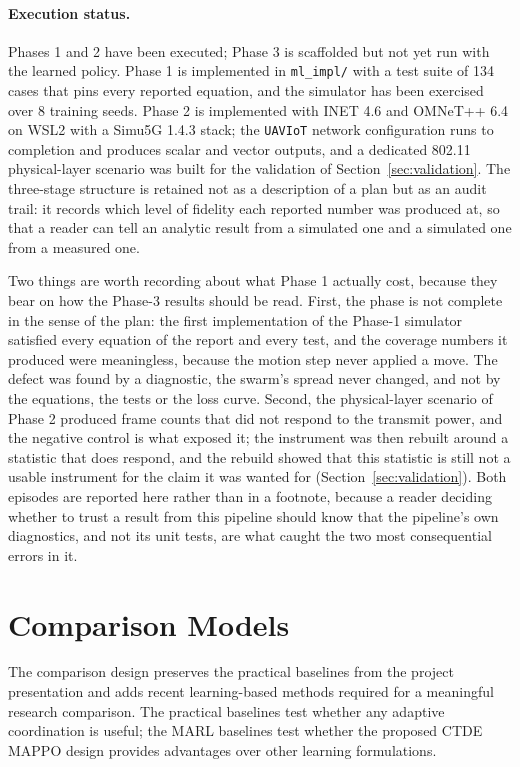 \documentclass[conference]{IEEEtran}
\newcommand{\tokMappoNSeeds}{8}
\newcommand{\tokNTests}{134}
\begin{document}
\paragraph{Execution status.}
Phases 1 and 2 have been executed; Phase 3 is scaffolded but not yet run with the learned policy. Phase 1 is implemented in \texttt{ml\_impl/} with a test suite of \tokNTests{} cases that pins every reported equation, and the simulator has been exercised over \tokMappoNSeeds{} training seeds. Phase 2 is implemented with INET 4.6 and OMNeT++ 6.4 on WSL2 with a Simu5G 1.4.3 stack; the \texttt{UAVIoT} network configuration runs to completion and produces scalar and vector outputs, and a dedicated 802.11 physical-layer scenario was built for the validation of Section~\ref{sec:validation}. The three-stage structure is retained not as a description of a plan but as an audit trail: it records which level of fidelity each reported number was produced at, so that a reader can tell an analytic result from a simulated one and a simulated one from a measured one.

Two things are worth recording about what Phase 1 actually cost, because they bear on how the Phase-3 results should be read. First, the phase is not complete in the sense of the plan: the first implementation of the Phase-1 simulator satisfied every equation of the report and every test, and the coverage numbers it produced were meaningless, because the motion step never applied a move. The defect was found by a diagnostic, the swarm's spread never changed, and not by the equations, the tests or the loss curve. Second, the physical-layer scenario of Phase 2 produced frame counts that did not respond to the transmit power, and the negative control is what exposed it; the instrument was then rebuilt around a statistic that does respond, and the rebuild showed that this statistic is still not a usable instrument for the claim it was wanted for (Section~\ref{sec:validation}). Both episodes are reported here rather than in a footnote, because a reader deciding whether to trust a result from this pipeline should know that the pipeline's own diagnostics, and not its unit tests, are what caught the two most consequential errors in it.


\section{Comparison Models}
\label{sec:comparison}
The comparison design preserves the practical baselines from the project presentation and adds recent learning-based methods required for a meaningful research comparison. The practical baselines test whether any adaptive coordination is useful; the MARL baselines test whether the proposed CTDE MAPPO design provides advantages over other learning formulations.
\end{document}
